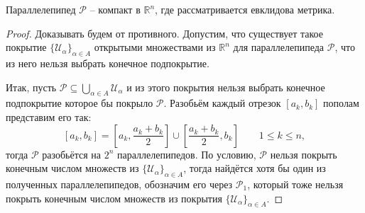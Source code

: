 \begin{proposition}\label{cub_is_compact}
    Параллелепипед $\mathcal{P}$ -- компакт в $\mathbb{R}^n$, где рассматривается евклидова метрика.
\end{proposition}
\begin{proof}
Доказывать будем от противного. Допустим, что существует такое покрытие $\{\mathscr{U}_\alpha\}_{\alpha \in A}$ открытыми множествами из $\mathbb{R}^n$ для параллелепипеда $\mathcal{P}$, что из него нельзя выбрать конечное подпокрытие. 

Итак, пусть $\mathcal{P} \subseteq \bigcup_{\alpha \in A} \mathscr{U}_\alpha$ и из этого покрытия нельзя выбрать конечное подпокрытие которое бы покрыло $\mathcal{P}$. Разобьём каждый отрезок $[a_k, b_k]$ пополам \ie представим его так:
    \[
     [a_k, b_k] = \left[ a_k, \frac{a_k+b_k}{2} \right] \cup \left[\frac{a_k +b_k}{2}, b_k \right] \qquad 1 \le k \le n,
    \]
тогда $\mathcal{P}$ разобьётся на $2^n$ параллелепипедов. По условию, $\mathcal{P}$ нельзя покрыть конечным числом множеств из $\{ \mathscr{U}_\alpha\}_{\alpha \in A}$, тогда найдётся хотя бы один из полученных параллелепипедов, обозначим его через $\mathcal{P}_1$, который тоже нельзя покрыть конечным числом множеств из покрытия $\{ \mathscr{U}_\alpha\}_{\alpha \in A}$.


\end{proof}
